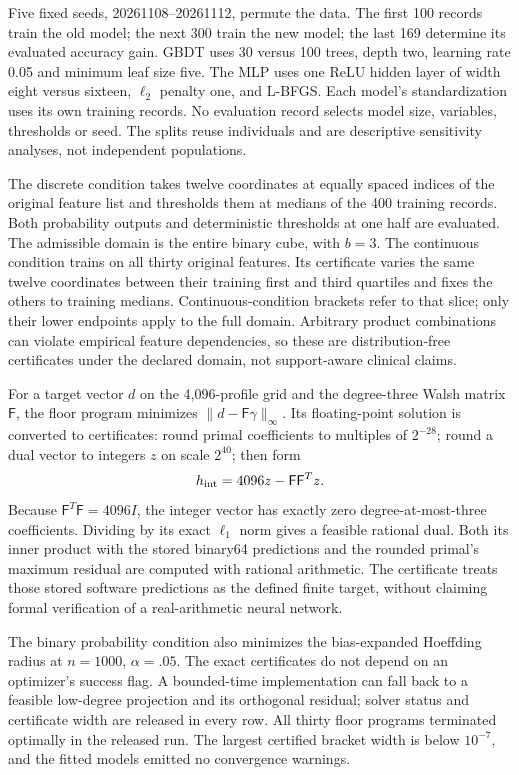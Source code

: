 Five fixed seeds, 20261108--20261112, permute the data. The first 100
records train the old model; the next 300 train the new model; the last
169 determine its evaluated accuracy gain. GBDT uses 30 versus 100 trees,
depth two, learning rate 0.05 and minimum leaf size five. The MLP uses
one ReLU hidden layer of width eight versus sixteen, $\ell_2$ penalty one,
and L-BFGS. Each model's standardization uses its own training records.
No evaluation record selects model size, variables, thresholds or seed. The splits reuse individuals and are descriptive sensitivity analyses, not independent populations.

The discrete condition takes twelve coordinates at equally spaced indices
of the original feature list and thresholds them at medians of the 400
training records. Both probability outputs and deterministic thresholds
at one half are evaluated. The admissible domain is the entire binary
cube, with $b=3$. The continuous condition trains on all thirty original
features. Its certificate varies the same twelve coordinates between
their training first and third quartiles and fixes the others to training
medians. Continuous-condition brackets refer to that slice; only their
lower endpoints apply to the full domain. Arbitrary product combinations
can violate empirical feature dependencies, so these are distribution-free
certificates under the declared domain, not support-aware clinical claims.

For a target vector $d$ on the 4,096-profile grid and the degree-three
Walsh matrix $\mathsf F$, the floor program minimizes
$\|d-\mathsf F\gamma\|_\infty$. Its floating-point solution is converted
to certificates: round primal coefficients to multiples of $2^{-28}$;
round a dual vector to integers $z$ on scale $2^{40}$; then form
\[
 h_{\rm int}=4096z-\mathsf F\mathsf F^Tz.
\]
Because $\mathsf F^T\mathsf F=4096I$, the integer vector has exactly zero
degree-at-most-three coefficients. Dividing by its exact $\ell_1$ norm
gives a feasible rational dual. Both its inner product with the stored
binary64 predictions and the rounded primal's maximum residual are
computed with rational arithmetic. The certificate treats those stored
software predictions as the defined finite target, without claiming
formal verification of a real-arithmetic neural network.

The binary probability condition also minimizes the bias-expanded
Hoeffding radius at $n=1000$, $\alpha=.05$. The exact certificates do not
depend on an optimizer's success flag. A bounded-time implementation can
fall back to a feasible low-degree projection and its orthogonal residual;
solver status and certificate width are released in every row.
All thirty floor programs terminated optimally in the released run. The
largest certified bracket width is below $10^{-7}$, and the fitted models
emitted no convergence warnings.

